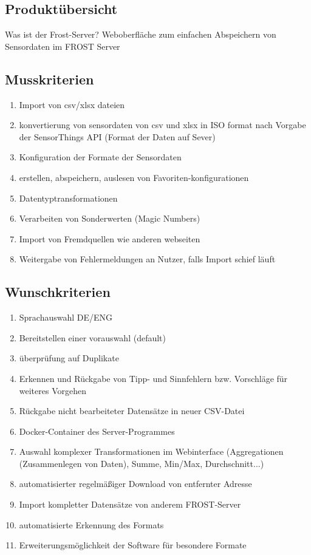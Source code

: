 \documentclass[12 pt]{article}
\begin{document}
\subsection{Produktübersicht}
Was ist der Frost-Server?
Weboberfläche zum einfachen Abspeichern von Sensordaten im FROST Server

\subsection{Musskriterien}
\begin{enumerate}
\item Import von csv/xlsx dateien
\item konvertierung von sensordaten von csv und xlsx in ISO format nach Vorgabe der SensorThings API (Format der Daten auf Sever)
\item Konfiguration der Formate der Sensordaten
\item erstellen, abspeichern, auslesen von Favoriten-konfigurationen
\item Datentyptransformationen
\item Verarbeiten von Sonderwerten (Magic Numbers)
\item Import von Fremdquellen wie anderen webseiten
\item Weitergabe von Fehlermeldungen an Nutzer, falls Import schief läuft
\end{enumerate}

\subsection{Wunschkriterien}
\begin{enumerate}
\item Sprachauswahl DE/ENG
\item Bereitstellen einer vorauswahl (default)
\item überprüfung auf Duplikate
\item Erkennen und Rückgabe von Tipp- und Sinnfehlern bzw. Vorschläge für weiteres Vorgehen
\item Rückgabe nicht bearbeiteter Datensätze in neuer CSV-Datei
\item Docker-Container des Server-Programmes
\item Auswahl komplexer Transformationen im Webinterface (Aggregationen (Zusammenlegen von Daten), Summe, Min/Max, Durchschnitt...)
\item automatisierter regelmäßiger Download von entfernter Adresse
\item Import kompletter Datensätze von anderem FROST-Server
\item automatisierte Erkennung des Formats
\item Erweiterungsmöglichkeit der Software für besondere Formate

\end{enumerate}
\end{document}
